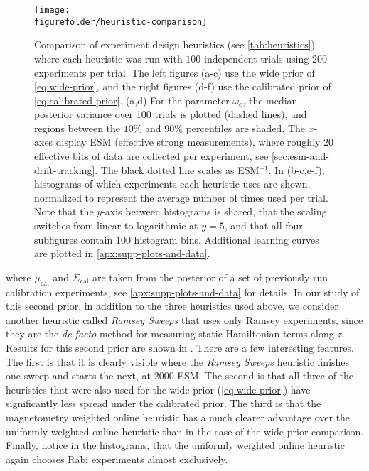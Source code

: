 \documentclass[aps,nofootinbib,twocolumn,superscriptaddress]{revtex4}
\newcommand{\figurefolder}{../fig}
\newcommand{\calib}{{\text{cal}}}
\begin{document}
\begin{figure*}[t!]
    \centering
    \texttt{[image: \\figurefolder/heuristic-comparison]}
    \caption{Comparison of experiment design heuristics
    (see \autoref{tab:heuristics}) where each heuristic was run
    with $100$ independent trials using $200$ experiments per trial.
    The left figures (a-c) use the wide prior of \autoref{eq:wide-prior},
    and the right figures (d-f) use the calibrated prior of
    \autoref{eq:calibrated-prior}.
    (a,d) For the parameter $\omega_e$, the median posterior variance
    over 100 trials is plotted (dashed lines), and
    regions between the $10\%$ and $90\%$ percentiles are shaded.
    The $x$-axes display ESM (effective strong measurements), where
    roughly $20$ effective bits of data are collected per experiment,
    see \autoref{sec:esm-and-drift-tracking}.
    The black dotted line scales as ESM$^{-1}$.
    In (b-c,e-f), histograms of which experiments each heuristic uses are
    shown, normalized to represent the average number of times
    used per trial.
    Note that the $y$-axis between histograms is shared, that
    the scaling switches from linear to logarithmic at $y=5$, and
    that all four subfigures contain $100$ histogram bins.
    Additional learning curves are plotted in \autoref{apx:supp-plots-and-data}.
    }
    \label{fig:heuristic-comparison}
\end{figure*}
where $\mu_\calib$ and $\Sigma_\calib$ are taken
from the posterior of a set of previously run calibration
experiments, see \autoref{apx:supp-plots-and-data} for
details.
In our study of this second prior, in addition to
the three heuristics used above,
we consider another heuristic called \textit{Ramsey Sweeps} that uses only
Ramsey experiments, since they are the \textit{de facto} method for
measuring static Hamiltonian terms along $z$.
Results for this second prior
are shown in .
There are a few interesting features.
The first is that it is clearly visible where the \textit{Ramsey Sweeps}
heuristic finishes one sweep and starts the next, at 2000 ESM.
The second is that all three of the heuristics that were also used
for the wide prior (\autoref{eq:wide-prior}) have significantly
less spread under the calibrated prior.
The third is that the magnetometry weighted online heuristic has a much
clearer advantage over the uniformly weighted online heuristic than in
the case of the wide prior comparison.
Finally, notice in the histograms, that the uniformly weighted
online heuristic again chooses Rabi experiments almost
exclusively.
\end{document}
